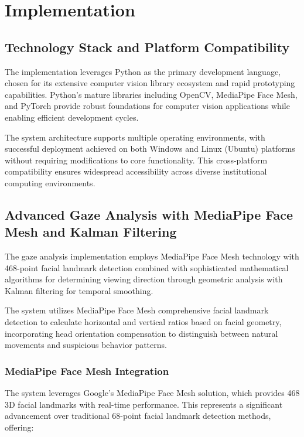 \documentclass[conference]{IEEEtran}
\begin{document}
\section{Implementation}

\subsection{Technology Stack and Platform Compatibility}

The implementation leverages Python as the primary development language, chosen for its 
extensive computer vision library ecosystem and rapid prototyping capabilities. Python's 
mature libraries including OpenCV, MediaPipe Face Mesh, and PyTorch provide robust 
foundations for computer vision applications while enabling efficient development cycles.

The system architecture supports multiple operating environments, with successful 
deployment achieved on both Windows and Linux (Ubuntu) platforms without requiring 
modifications to core functionality. This cross-platform compatibility ensures 
widespread accessibility across diverse institutional computing environments.

\subsection{Advanced Gaze Analysis with MediaPipe Face Mesh and Kalman Filtering}

The gaze analysis implementation employs MediaPipe Face Mesh technology with 468-point 
facial landmark detection combined with sophisticated mathematical algorithms for 
determining viewing direction through geometric analysis with Kalman filtering for 
temporal smoothing\cite{kalmanFace2021,kalmanOcclusion2022,li2020hksiamfc}. 

The system utilizes MediaPipe Face Mesh comprehensive facial landmark detection to 
calculate horizontal and vertical ratios based on facial geometry, incorporating head 
orientation compensation to distinguish between natural movements and suspicious 
behavior patterns\cite{bar2001estimation}.

\subsubsection{MediaPipe Face Mesh Integration}

The system leverages Google's MediaPipe Face Mesh solution, which provides 468 3D 
facial landmarks with real-time performance. This represents a significant advancement 
over traditional 68-point facial landmark detection methods, offering:
\end{document}
